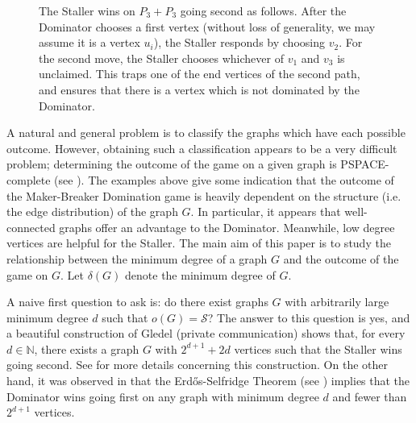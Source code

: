 \documentclass[a4paper,11pt,oneside]{scrartcl}
\theoremstyle{definition}
\theoremstyle{remark}
\begin{document}
\begin{figure}[ht] 
    \centering
    
    \caption{The Staller wins on $P_3+P_3$ going second as follows. After the Dominator chooses a first vertex (without loss of generality, we may assume it is a vertex $u_i$), the Staller responds by choosing $v_2$. For the second move, the Staller chooses whichever of $v_1$ and $v_3$ is unclaimed. This traps one of the end vertices of the second path, and ensures that there is a vertex which is not dominated by the Dominator.}
    \label{fig:p3p3}
\end{figure}


A natural and general problem is to classify the graphs which have each possible outcome. However, obtaining such a classification appears to be a very difficult problem; determining the outcome of the game on a given graph is PSPACE-complete (see \cite{DGPR}). The examples above give some indication that the outcome of the Maker-Breaker Domination game is heavily dependent on the structure (i.e. the edge distribution) of the graph $G$. In particular, it appears that well-connected graphs offer an advantage to the Dominator. Meanwhile, low degree vertices are helpful for the Staller. The main aim of this paper is to study the relationship between the minimum degree of a graph $G$ and the outcome of the game on $G$. Let $\delta(G)$ denote the minimum degree of $G$.

A naive first question to ask is: do there exist graphs $G$ with arbitrarily large minimum degree $d$ such that $o(G)= \mathcal S$? The answer to this question is yes, and a beautiful construction of Gledel (private communication) shows that, for every $d \in \mathbb N$, there exists a graph $G$ with $2^{d+1}+2d$ vertices such that the Staller wins going second. See  for more details concerning this construction. On the other hand, it was observed in \cite{DGPR} that the Erd\H{o}s-Selfridge Theorem (see ) implies that the Dominator wins going first on any graph with minimum degree $d$ and fewer than $2^{d+1}$ vertices.
\end{document}
